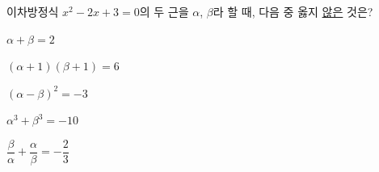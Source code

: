 이차방정식 $x^2-2x+3=0$의 두 근을 $\alpha$, $\beta$라 할 때, 다음 중 옳지 \underline{않은} 것은?
\begin{choicesii}{\rule[-3ex]{0pt}{8ex}$\alpha+\beta=2$}{\rule[-3ex]{0pt}{8ex}$(\alpha+1)(\beta+1)=6$}{\rule[-3ex]{0pt}{8ex}$(\alpha-\beta)^2=-3$}{\rule[-3ex]{0pt}{8ex}$\alpha^3+\beta^3=-10$}{\rule[-3ex]{0pt}{8ex}$\dfrac{\beta}{\alpha}+\dfrac{\alpha}{\beta}=-\dfrac{2}{3}$}\end{choicesii}
